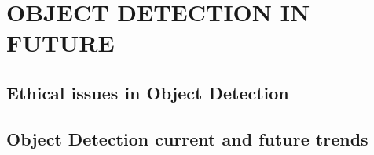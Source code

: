 \documentclass[12pt]{article}
\begin{document}

\section{OBJECT DETECTION IN FUTURE}
\label{sec:future}
\subsection{Ethical issues in Object Detection}
\label{sec:ethical}
\subsection{Object Detection current and future trends}
\label{sec:trend}


\newpage
\printbibliography[title=References]
\end{document}
